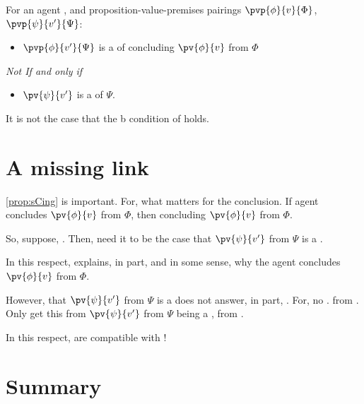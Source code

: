 \begin{note}
  \begin{proposition}
    For an agent \vAgent{}, and proposition-value-premises pairings \(\pvp{\phi}{v}{\Phi}\), \(\pvp{\psi}{v'}{\Psi}\):

    \begin{itemize}
    \item
      \(\pvp{\phi}{v'}{\Psi}\) is a \emph{\curb{}} of concluding \(\pv{\phi}{v}\) from \(\Phi\)
    \end{itemize}

    \emph{Not If and only if}

    \begin{itemize}
    \item
      \(\pv{\psi}{v'}\) is a \fc{} of \(\Psi\).
    \end{itemize}
    \begin{argument}
      It is not the case that the b condition of \fc{} holds.
    \end{argument}
  \end{proposition}
\end{note}



\section{A missing link}
\label{cha:zS:sec:missing-link}

\begin{note}
  \autoref{prop:sCing} is important.
  For, what matters for the conclusion.
  If agent concludes \(\pv{\phi}{v}\) from \(\Phi\), then concluding \(\pv{\phi}{v}\) from \(\Phi\).

  So, suppose, \curb{}.
  Then, need it to be the case that \(\pv{\psi}{v'}\) from \(\Psi\) is a \fc{}.

  In this respect, \fc{} explains, in part, and in some sense, why the agent concludes \(\pv{\phi}{v}\) from \(\Phi\).

  However, that \(\pv{\psi}{v'}\) from \(\Psi\) is a \fc{} does not answer, in part, \qWhyV{}.
  For, no \ros{}.
  \ros{} from \agpe{}.
  Only get this from \(\pv{\psi}{v'}\) from \(\Psi\) being a \fc{}, from \agpe{}.

  In this respect,  are compatible with \issueConstraint{}!
\end{note}

\section{Summary}
\label{cha:zS:sec:curbs:summary}


